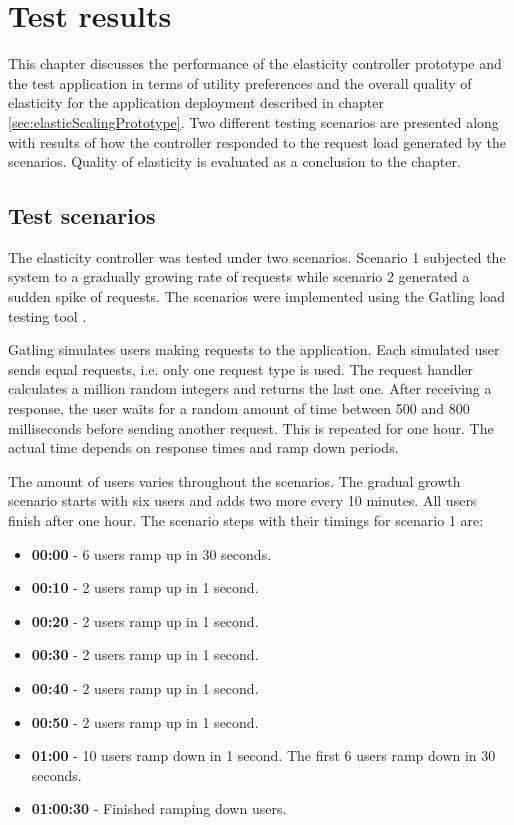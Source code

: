 \documentclass[english]{tktltiki2}
\theoremstyle{definition}
\theoremstyle{remark}
\begin{document}
\section{Test results}
\label{sec:results}

This chapter discusses the performance of the elasticity controller prototype
and the test application in terms of utility preferences and the overall quality
of elasticity for the application deployment described in chapter~
\ref{sec:elasticScalingPrototype}. Two different testing scenarios are
presented along with results of how the controller responded to the request load
generated by the scenarios. Quality of elasticity is evaluated as a conclusion to the chapter.

\subsection{Test scenarios} \label{sec:testScenarios} 

The elasticity controller was tested under two scenarios. Scenario 1 subjected
the system to a gradually growing rate of requests while scenario 2 generated a
sudden spike of requests. The scenarios were implemented using the Gatling load
testing tool \cite{gatling}.

Gatling simulates users making requests to the application. Each simulated user
sends equal requests, i.e. only one request type is used. The request handler
calculates a million random integers and returns the last one. After receiving a
response, the user waits for a random amount of time between 500 and 800
milliseconds before sending another request. This is repeated for one hour. The
actual time depends on response times and ramp down periods.

The amount of users varies throughout the scenarios. The gradual growth scenario
starts with six users and adds two more every 10 minutes. All users finish after
one hour. The scenario steps with their timings for scenario 1 are:

\begin{itemize}
	\item{\textbf{00:00} - 6 users ramp up in 30 seconds.}
	\item{\textbf{00:10} - 2 users ramp up in 1 second.}
	\item{\textbf{00:20} - 2 users ramp up in 1 second.}
	\item{\textbf{00:30} - 2 users ramp up in 1 second.}
	\item{\textbf{00:40} - 2 users ramp up in 1 second.}
	\item{\textbf{00:50} - 2 users ramp up in 1 second.}
	\item{\textbf{01:00} - 10 users ramp down in 1 second. The first 6 users ramp 
			down in 30 seconds.}	
	\item{\textbf{01:00:30} - Finished ramping down users.}
	\label{gatlingStepsScenario1}
\end{itemize}
\end{document}
